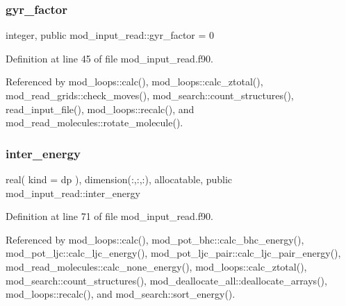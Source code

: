 \subsubsection{\texorpdfstring{gyr\+\_\+factor}{gyr\_factor}}
{\footnotesize\ttfamily integer, public mod\+\_\+input\+\_\+read\+::gyr\+\_\+factor = 0}



Definition at line 45 of file mod\+\_\+input\+\_\+read.\+f90.



Referenced by mod\+\_\+loops\+::calc(), mod\+\_\+loops\+::calc\+\_\+ztotal(), mod\+\_\+read\+\_\+grids\+::check\+\_\+moves(), mod\+\_\+search\+::count\+\_\+structures(), read\+\_\+input\+\_\+file(), mod\+\_\+loops\+::recalc(), and mod\+\_\+read\+\_\+molecules\+::rotate\+\_\+molecule().

\mbox{\label{namespacemod__input__read_a59e3573d7d32b72bd699ac1708e70908}} 
\subsubsection{\texorpdfstring{inter\+\_\+energy}{inter\_energy}}
{\footnotesize\ttfamily real( kind = dp ), dimension(\+:,\+:,\+:), allocatable, public mod\+\_\+input\+\_\+read\+::inter\+\_\+energy}



Definition at line 71 of file mod\+\_\+input\+\_\+read.\+f90.



Referenced by mod\+\_\+loops\+::calc(), mod\+\_\+pot\+\_\+bhc\+::calc\+\_\+bhc\+\_\+energy(), mod\+\_\+pot\+\_\+ljc\+::calc\+\_\+ljc\+\_\+energy(), mod\+\_\+pot\+\_\+ljc\+\_\+pair\+::calc\+\_\+ljc\+\_\+pair\+\_\+energy(), mod\+\_\+read\+\_\+molecules\+::calc\+\_\+none\+\_\+energy(), mod\+\_\+loops\+::calc\+\_\+ztotal(), mod\+\_\+search\+::count\+\_\+structures(), mod\+\_\+deallocate\+\_\+all\+::deallocate\+\_\+arrays(), mod\+\_\+loops\+::recalc(), and mod\+\_\+search\+::sort\+\_\+energy().

\mbox{\label{namespacemod__input__read_a3f3cf0bf8b5ebc1886d493eda84eecf4}} 
